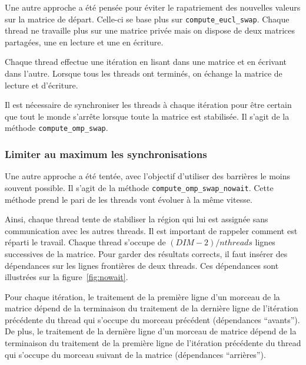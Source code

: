 Une autre approche a été pensée pour éviter le rapatriement des
nouvelles valeurs sur la matrice de départ. Celle-ci se base plus
sur \texttt{compute\_eucl\_swap}. Chaque thread ne travaille plus sur
une matrice privée mais on dispose de deux matrices partagées, une en
lecture et une en écriture.

Chaque thread effectue une itération en lisant dans une matrice et en
écrivant dans l'autre. Lorsque tous les threads ont terminés, on
échange la matrice de lecture et d'écriture.

Il est nécessaire de synchroniser les threads à chaque itération pour
être certain que tout le monde s'arrête lorsque toute la matrice est
stabilisée. Il s'agit de la méthode \texttt{compute\_omp\_swap}.
\medskip

\subsubsection{Limiter au maximum les synchronisations}

Une autre approche a été tentée, avec l'objectif d'utiliser des
barrières le moins souvent possible. Il s'agit de la méthode
\texttt{compute\_omp\_swap\_nowait}. Cette méthode prend
le pari de les threads vont évoluer à la même vitesse.
\medskip

Ainsi, chaque thread tente de stabiliser la région qui lui est
assignée sans communication avec les autres threads. Il est important
de rappeler comment est réparti le travail. Chaque thread s'occupe de
$(DIM-2)/nthreads$ lignes successives de la matrice. Pour garder des
résultats corrects, il faut insérer des dépendances sur les lignes
frontières de deux threads. Ces dépendances sont illustrées sur la
figure~\ref{fig:nowait}.
\medskip

Pour chaque itération, le traitement de la première ligne d'un morceau
de la matrice dépend de la terminaison du traitement de la dernière
ligne de l'itération précédente du thread qui s'occupe du morceau
précédent (dépendances ``avants''). De plus, le traitement de la
dernière ligne d'un morceau de matrice dépend de la terminaison du
traitement de la première ligne de l'itération précédente du thread
qui s'occupe du morceau suivant de la matrice (dépendances
``arrières'').
\medskip

